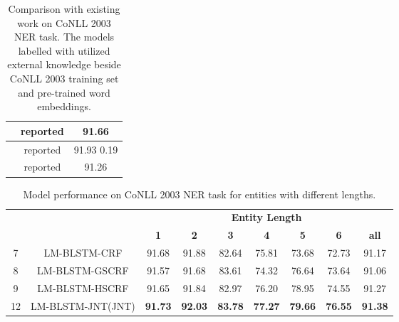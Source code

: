 \documentclass[11pt,a4paper]{article}
\begin{document}
\begin{table}[t!]
\begin{center}
\begin{tabular}{|c|c|c|}
\citet{tran2017named}              & reported   & 91.66              \\ \hline
\citet{peters2017semi}             & reported   & 91.93  0.19    \\ \hline
\citet{yang2017transfer}                   & reported   & 91.26              \\ \hline
\end{tabular}
\end{center}
\caption{\label{Tab:allNERresults} Comparison with existing work on CoNLL 2003 NER task. The models labelled with  utilized external knowledge beside CoNLL 2003 training set and pre-trained word embeddings. }
\end{table}


\begin{table*}[t!]
\small
\begin{center}
\begin{tabular}{|c|c|c|c|c|c|c|c|c|}
\hline

{\multirow{2}{*}{\bf No.}}&{\multirow{2}{*}{\bf Model Name}}   & \multicolumn{7}{c|}{\bf Entity Length} \\ \cline{3-9}
&& \bf 1  &  \bf 2 & \bf 3 & \bf 4  & \bf 5 & \bf  6 & \bf all  \\ \hline

7&LM-BLSTM-CRF      & 91.68        & 91.88        &82.64         & 75.81         & 73.68         & 72.73             & 91.17        \\ \hline
8&LM-BLSTM-GSCRF    & 91.57        & 91.68        &83.61         & 74.32         & 76.64            & 73.64             & 91.06        \\ \hline
9&LM-BLSTM-HSCRF    & 91.65        & 91.84        &82.97         & 76.20         & 78.95    &74.55              & 91.27        \\ \hline
12&LM-BLSTM-JNT(JNT)&\textbf{91.73}&\textbf{92.03}&\textbf{83.78}&\textbf{77.27} &\textbf{79.66} &\textbf{76.55}     &\textbf{91.38}\\ \hline
\end{tabular}
\end{center}
\caption{\label{Tab:Rresultlength}Model performance on CoNLL 2003 NER task for entities with different lengths.}
\end{table*}
\end{document}
